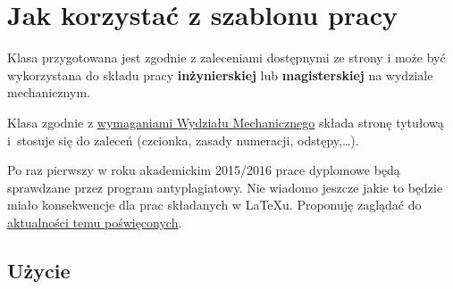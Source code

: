 

\chapter{Jak korzystać z szablonu pracy}

Klasa przygotowana jest zgodnie z zaleceniami dostępnymi ze strony \url{} i może być wykorzystana do składu pracy \textbf{inżynierskiej} lub \textbf{magisterskiej} na wydziale mechanicznym.

Klasa zgodnie z \href{http://www.wmech.pwr.wroc.pl/88428.dhtml}{wymaganiami Wydziału Mechanicznego} składa stronę tytułową i~stosuje się do zaleceń (czcionka, zasady numeracji, odstępy,\ldots).

Po raz pierwszy w roku akademickim 2015/2016 prace dyplomowe będą sprawdzane przez program antyplagiatowy. Nie wiadomo jeszcze jakie to będzie miało konsekwencje dla prac składanych w LaTeXu. Proponuję zaglądać do \href{http://kmim.wm.pwr.edu.pl/myszka/tag/antyplagiat/}{aktualności temu poświęconych}.

\section{Użycie}

